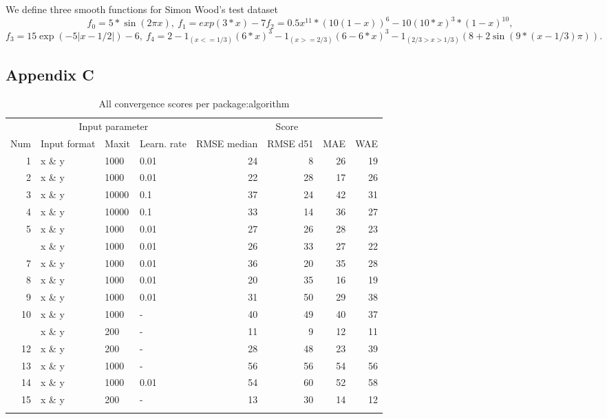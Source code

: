 We define three smooth functions for Simon Wood's test dataset \[
f_0=5*\sin(2\pi x),~
f_1=exp(3*x)-7
f_2=0.5 x^{11}*(10(1 - x))^6 - 10 (10*x)^3*(1 - x)^{10},~
\] \[
f_3=15 \exp(-5 |x-1/2|)-6,~
f_4=2-1_{(x <= 1/3)}(6*x)^3 - 1_{(x >= 2/3)} (6-6*x)^3 - 
1_{(2/3 > x > 1/3)}(8+2\sin(9*(x-1/3)\pi)).
\]

\hypertarget{appendix-c}{%
\subsection{Appendix C}\label{appendix-c}}

\begin{Schunk}
\begin{table}

\caption{\label{tab:unnamed-chunk-3}All convergence scores per package:algorithm}
\centering
\fontsize{8}{10}\selectfont
\begin{tabular}[t]{rlllrrrr}
\toprule
\multicolumn{1}{c}{ } & \multicolumn{3}{c}{Input parameter} & \multicolumn{4}{c}{Score} \\
\cmidrule(l{3pt}r{3pt}){2-4} \cmidrule(l{3pt}r{3pt}){5-8}
Num & Input format & Maxit & Learn. rate & RMSE median & RMSE d51 & MAE & WAE\\
\midrule
1 & x \& y & 1000 & 0.01 & 24 & 8 & 26 & 19\\
2 & x \& y & 1000 & 0.01 & 22 & 28 & 17 & 26\\
3 & x \& y & 10000 & 0.1 & 37 & 24 & 42 & 31\\
4 & x \& y & 10000 & 0.1 & 33 & 14 & 36 & 27\\
5 & x \& y & 1000 & 0.01 & 27 & 26 & 28 & 23\\
\addlinespace
6 & x \& y & 1000 & 0.01 & 26 & 33 & 27 & 22\\
7 & x \& y & 1000 & 0.01 & 36 & 20 & 35 & 28\\
8 & x \& y & 1000 & 0.01 & 20 & 35 & 16 & 19\\
9 & x \& y & 1000 & 0.01 & 31 & 50 & 29 & 38\\
10 & x \& y & 1000 & - & 40 & 49 & 40 & 37\\
\addlinespace
11 & x \& y & 200 & - & 11 & 9 & 12 & 11\\
12 & x \& y & 200 & - & 28 & 48 & 23 & 39\\
13 & x \& y & 1000 & - & 56 & 56 & 54 & 56\\
14 & x \& y & 1000 & 0.01 & 54 & 60 & 52 & 58\\
15 & x \& y & 200 & - & 13 & 30 & 14 & 12\\
\addlinespace

\end{tabular}
\end{table}
\end{Schunk}
